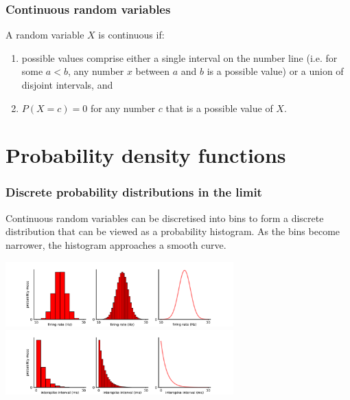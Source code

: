 \documentclass[9pt]{beamer}
\begin{document}
\begin{frame}
\frametitle{Continuous random variables}

\begin{definition} 
A random variable $X$ is continuous if:
\begin{enumerate}[label=\arabic*.]
\item possible values comprise either a single interval on the number line (i.e. for some $a < b$, any number $x$ between $a$ and $b$ is a possible value) or a union of disjoint intervals, and
\item  $P(X = c) = 0$ for any number $c$ that is a possible value of $X$.
\end{enumerate}
\end{definition}

\end{frame}

\section{Probability density functions}
\begin{frame}
\frametitle{Discrete probability distributions in the limit} %


Continuous random variables can be discretised into bins to form a discrete distribution that can be viewed as a probability histogram. As the bins become narrower, the histogram approaches a smooth curve.

\center \includegraphics[height=2.5cm]{images/normal_mass_to_hist.png}
\vspace{-0.25cm}
\center \includegraphics[height=2.5cm]{images/exp_mass_to_hist.png}

\end{frame}
\end{document}
